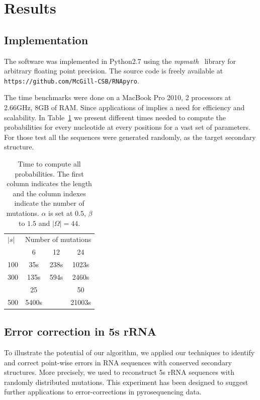\section{Results}
\label{sec:results}

\subsection{Implementation}
The software was implemented in Python2.7 using the \textit{mpmath}~\cite{mpmath} library
for  arbitrary floating point precision. The source code is freely available at \verb+https://github.com/McGill-CSB/RNApyro+.

The time benchmarks were done on a MacBook Pro 2010, 2 processors at 2.66GHz, 8GB of RAM.
Since applications of \RNApyro implies a need for
 efficiency and scalability. In Table~\ref{tab:time} we
present different times needed to compute the probabilities for  every nucleotide at every positions for a vast set of parameters. For those test
 all the sequences were generated randomly, as the target secondary structure.

\begin{table}
\begin{center}
\begin{tabular}{lccc}
$|s|$&\multicolumn{3}{c}{Number of mutations}\\\cline{2-4}
		 			  & 6   &  12  & 24\\\cline{2-4}
100  				& 35s  & 238s & 1023s\\
300  			& 135s & 594s &2460s\\\cline{2-4}
		 						& 25   &    &	50		\\\cline{2-4}
500         & 5400s&       &  21003s    \\
\end{tabular}
\end{center}
\caption{Time to compute all probabilities. The first column indicates the length and  the column indexes indicate the number
 of mutations. $\alpha$ is
set at $0.5$,  $\beta$ to $1.5$ and $|\Omega|=44$.}
\label{tab:time}
\end{table}


\subsection{Error correction in 5s rRNA}

To illustrate the potential of our algorithm, we applied our techniques to identify and correct point-wise errors in RNA sequences
with conserved secondary structures. More precisely, we used \RNApyro to reconstruct 5s rRNA sequences with randomly distributed
mutations. This experiment has been designed to suggest further applications to error-corrections in pyrosequencing data.

